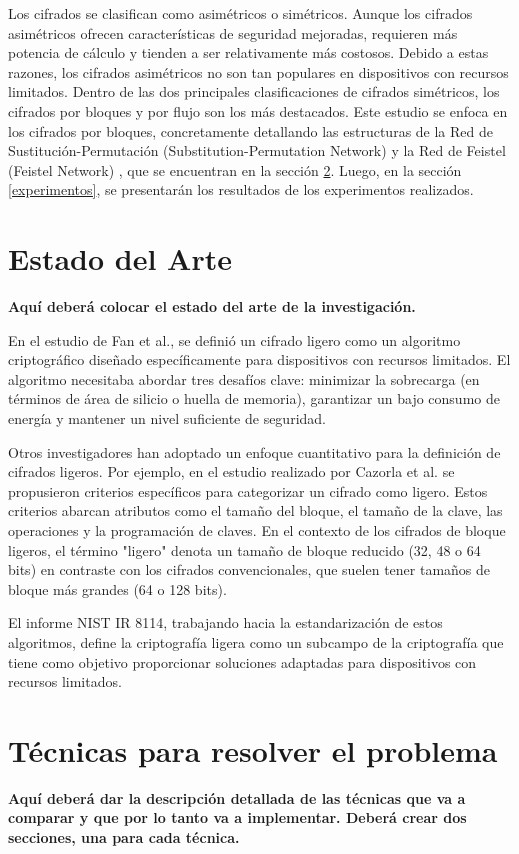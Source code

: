 \documentclass[conference]{IEEEtran}
\begin{document}
Los cifrados se clasifican como asimétricos o simétricos. Aunque los cifrados asimétricos ofrecen características de seguridad mejoradas, requieren más potencia de cálculo y tienden a ser relativamente más costosos. Debido a estas razones, los cifrados asimétricos no son tan populares en dispositivos con recursos limitados. Dentro de las dos principales clasificaciones de cifrados simétricos, los cifrados por bloques y por flujo son los más destacados. Este estudio se enfoca en los cifrados por bloques, concretamente detallando las estructuras de la Red de Sustitución-Permutación (Substitution-Permutation Network) \cite{heys1996substitution} y la Red de Feistel (Feistel Network) \cite{FEISTEL}, que se encuentran en la sección \ref{tecnicas}. Luego, en la sección \ref{experimentos}, se presentarán los resultados de los experimentos realizados.

\section{Estado del Arte}
\textbf{Aquí deberá colocar el estado del arte de la investigación.}

En el estudio de Fan et al.\cite{fan2013wg}, se definió un cifrado ligero como un algoritmo criptográfico diseñado específicamente para dispositivos con recursos limitados. El algoritmo necesitaba abordar tres desafíos clave: minimizar la sobrecarga (en términos de área de silicio o huella de memoria), garantizar un bajo consumo de energía y mantener un nivel suficiente de seguridad.

Otros investigadores han adoptado un enfoque cuantitativo para la definición de cifrados ligeros. Por ejemplo, en el estudio realizado por Cazorla et al.\cite{cazorla2013survey} se propusieron criterios específicos para categorizar un cifrado como ligero. Estos criterios abarcan atributos como el tamaño del bloque, el tamaño de la clave, las operaciones y la programación de claves. En el contexto de los cifrados de bloque ligeros, el término "ligero" denota un tamaño de bloque reducido (32, 48 o 64 bits) en contraste con los cifrados convencionales, que suelen tener tamaños de bloque más grandes (64 o 128 bits).

El informe NIST IR 8114\cite{NIST}, trabajando hacia la estandarización de estos algoritmos, define la criptografía ligera como un subcampo de la criptografía que tiene como objetivo proporcionar soluciones adaptadas para dispositivos con recursos limitados.


\section{Técnicas para resolver el problema} \label{tecnicas}
\textbf{Aquí deberá dar la descripción detallada de las técnicas que va a comparar y que por lo tanto va a implementar. Deberá crear dos secciones, una para cada técnica.}
\end{document}
